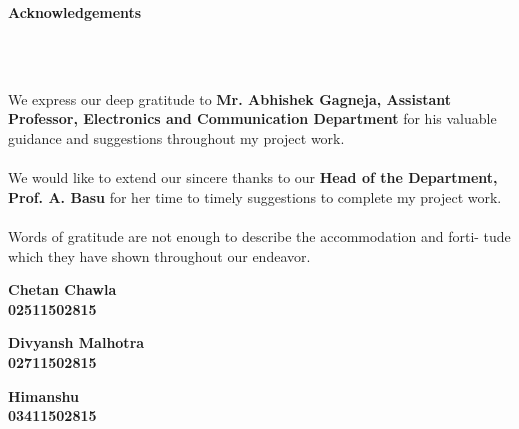 \begin{center}
\thispagestyle{empty}
\LARGE{\textbf{Acknowledgements}}\\[1cm]
\end{center}
\linespread{1.13}
\\
\\
 \large{We express our deep gratitude to \textbf{Mr. Abhishek Gagneja, Assistant Professor, Electronics and Communication Department} for his valuable guidance and suggestions throughout my project work. 
\\
\\
We would like to extend our sincere thanks to our \textbf{Head of the Department,} \textbf{Prof. A. Basu} for her time to timely suggestions to complete my project work.
\\
\\
Words  of  gratitude  are  not  enough  to  describe  the  accommodation  and  forti-
tude which they have shown throughout our endeavor.
\vspace{2in}
\\
\begin{minipage}{0.35\linewidth}
\begin{center}
\textbf{Chetan Chawla\\
02511502815}
\end{center}
\end{minipage}
\begin{minipage}{0.30\linewidth}
\begin{center}
\textbf{Divyansh Malhotra\\
02711502815}    
\end{center}
\end{minipage}
\begin{minipage}{0.30\linewidth}
\begin{center}
\textbf{Himanshu\\
03411502815}    
\end{center}
\end{minipage}
\vspace{0.2in}
\\
}

